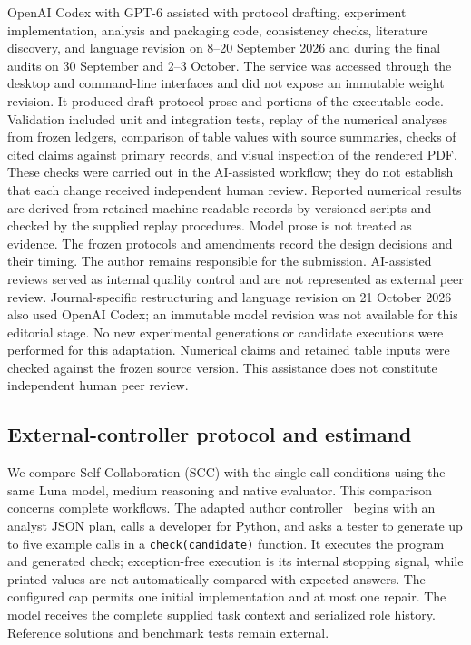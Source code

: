 \documentclass[pdflatex,sn-nature]{scientificreports}
\begin{document}
OpenAI Codex with GPT-6 assisted with protocol drafting, experiment implementation, analysis and packaging code, consistency checks, literature discovery, and language revision on 8--20 September 2026 and during the final audits on 30 September and 2--3 October. The service was accessed through the desktop and command-line interfaces and did not expose an immutable weight revision. It produced draft protocol prose and portions of the executable code. Validation included unit and integration tests, replay of the numerical analyses from frozen ledgers, comparison of table values with source summaries, checks of cited claims against primary records, and visual inspection of the rendered PDF. These checks were carried out in the AI-assisted workflow; they do not establish that each change received independent human review. Reported numerical results are derived from retained machine-readable records by versioned scripts and checked by the supplied replay procedures. Model prose is not treated as evidence. The frozen protocols and amendments record the design decisions and their timing. The author remains responsible for the submission. AI-assisted reviews served as internal quality control and are not represented as external peer review. Journal-specific restructuring and language revision on 21 October 2026 also used OpenAI Codex; an immutable model revision was not available for this editorial stage. No new experimental generations or candidate executions were performed for this adaptation. Numerical claims and retained table inputs were checked against the frozen source version. This assistance does not constitute independent human peer review.


\subsection{External-controller protocol and estimand}
We compare Self-Collaboration (SCC) with the single-call conditions using the same Luna model, medium reasoning and native evaluator. This comparison concerns complete workflows. The adapted author controller~\cite{scc2024source} begins with an analyst JSON plan, calls a developer for Python, and asks a tester to generate up to five example calls in a \texttt{check(candidate)} function. It executes the program and generated check; exception-free execution is its internal stopping signal, while printed values are not automatically compared with expected answers. The configured cap permits one initial implementation and at most one repair. The model receives the complete supplied task context and serialized role history. Reference solutions and benchmark tests remain external.
\end{document}
